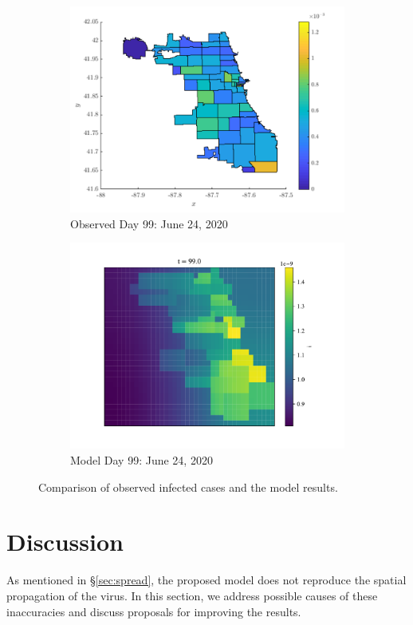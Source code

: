 \documentclass[11pt]{article}
\begin{document}
\begin{figure}[H]
			\begin{subfigure}{0.5\textwidth}
				\includegraphics[width=\textwidth]{tfin-cases}
				\caption{Observed Day 99: June 24, 2020}
			\end{subfigure}%
			\begin{subfigure}{0.5\textwidth}
				\includegraphics[width=\textwidth]{infected_99}
				\caption{Model Day 99: June 24, 2020}
			\end{subfigure}
		
			\caption{Comparison of observed infected cases and the model results.}
			\label{fig:spatial-results}
		\end{figure}
	

\section{Discussion}
	As mentioned in \S \ref{sec:spread}, the proposed model does not reproduce the spatial propagation of the virus.
	In this section, we address possible causes of these inaccuracies and discuss proposals for improving the results.
	
\end{document}
